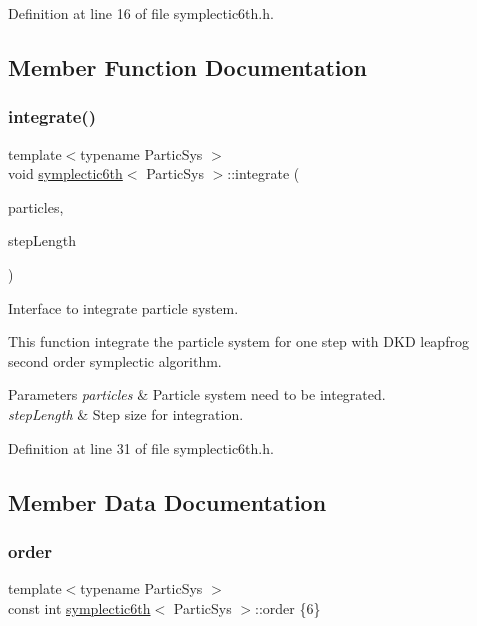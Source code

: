 Definition at line 16 of file symplectic6th.\+h.



\subsection{Member Function Documentation}
\mbox{\label{classsymplectic6th_ae1e6b8a64e8db932df8e1afb4ff23e0a}} 
\subsubsection{\texorpdfstring{integrate()}{integrate()}}
{\footnotesize\ttfamily template$<$typename Partic\+Sys $>$ \\
void \mbox{\hyperlink{classsymplectic6th}{symplectic6th}}$<$ Partic\+Sys $>$\+::integrate (\begin{DoxyParamCaption}\item[{Partic\+Sys \&}]{particles,  }\item[{\mbox{\hyperlink{classsymplectic6th_a1059d63d55058db7c6ab5b71e097f3ee}{Scalar}}}]{step\+Length }\end{DoxyParamCaption})}



Interface to integrate particle system. 

This function integrate the particle system for one step with D\+KD leapfrog second order symplectic algorithm. 
\begin{DoxyParams}{Parameters}
{\em particles} & Particle system need to be integrated. \\
\hline
{\em step\+Length} & Step size for integration. \\
\hline
\end{DoxyParams}


Definition at line 31 of file symplectic6th.\+h.



\subsection{Member Data Documentation}
\mbox{\label{classsymplectic6th_a7f4232a8639d27aeb0890476176e8553}} 
\subsubsection{\texorpdfstring{order}{order}}
{\footnotesize\ttfamily template$<$typename Partic\+Sys $>$ \\
const int \mbox{\hyperlink{classsymplectic6th}{symplectic6th}}$<$ Partic\+Sys $>$\+::order \{6\}\hspace{0.3cm}{\ttfamily [static]}}



